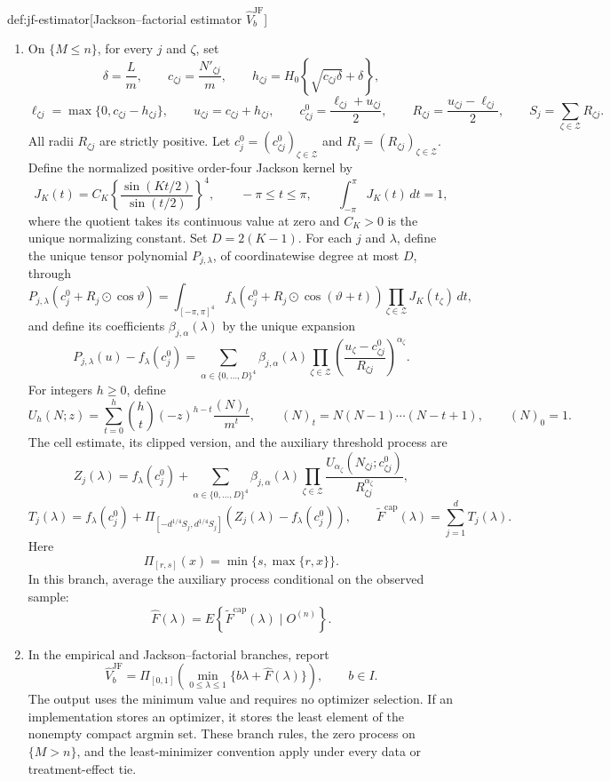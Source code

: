 \documentclass[11pt]{article}
\begin{document}
\begin{algorithmv}{def:jf-estimator}[Jackson–factorial estimator $\widehat V_b^{\mathrm{JF}}$]
\begin{enumerate}
\item On \(\{M\leq n\}\), for every \(j\) and \(\zeta\), set
\[
\delta=\frac Lm,\qquad
c_{\zeta j}=\frac{N'_{\zeta j}}m,\qquad
h_{\zeta j}=H_0\left\{\sqrt{c_{\zeta j}\delta}+\delta\right\},
\]
\[
\ell_{\zeta j}=\max\{0,c_{\zeta j}-h_{\zeta j}\},
\qquad
u_{\zeta j}=c_{\zeta j}+h_{\zeta j},
\qquad
c^0_{\zeta j}=\frac{\ell_{\zeta j}+u_{\zeta j}}2,
\qquad
R_{\zeta j}=\frac{u_{\zeta j}-\ell_{\zeta j}}2,
\qquad
S_j=\sum_{\zeta\in\mathcal Z}R_{\zeta j}.
\]
All radii \(R_{\zeta j}\) are strictly positive. Let \(c_j^0=(c^0_{\zeta j})_{\zeta\in\mathcal Z}\) and \(R_j=(R_{\zeta j})_{\zeta\in\mathcal Z}\). Define the normalized positive order-four Jackson kernel by
\[
J_K(t)=C_K\left\{\frac{\sin(Kt/2)}{\sin(t/2)}\right\}^{4},
\qquad -\pi\leq t\leq\pi,
\qquad
\int_{-\pi}^{\pi}J_K(t)\,dt=1,
\]
where the quotient takes its continuous value at zero and \(C_K>0\) is the unique normalizing constant. Set \(D=2(K-1)\). For each \(j\) and \(\lambda\), define the unique tensor polynomial \(P_{j,\lambda}\), of coordinatewise degree at most \(D\), through
\[
P_{j,\lambda}(c_j^0+R_j\odot\cos\vartheta)
=
\int_{[-\pi,\pi]^4}
f_\lambda\!\left(c_j^0+R_j\odot\cos(\vartheta+t)\right)
\prod_{\zeta\in\mathcal Z}J_K(t_\zeta)\,dt,
\]
and define its coefficients \(\beta_{j,\alpha}(\lambda)\) by the unique expansion
\[
P_{j,\lambda}(u)-f_\lambda(c_j^0)
=
\sum_{\alpha\in\{0,\ldots,D\}^4}
\beta_{j,\alpha}(\lambda)
\prod_{\zeta\in\mathcal Z}
\left(\frac{u_\zeta-c^0_{\zeta j}}{R_{\zeta j}}\right)^{\alpha_\zeta}.
\]
For integers \(h\geq0\), define
\[
U_h(N;z)
=
\sum_{t=0}^h {h\choose t}(-z)^{h-t}\frac{(N)_t}{m^t},
\qquad
(N)_t=N(N-1)\cdots(N-t+1),
\qquad
(N)_0=1.
\]
The cell estimate, its clipped version, and the auxiliary threshold process are
\[
Z_j(\lambda)
=
f_\lambda(c_j^0)+
\sum_{\alpha\in\{0,\ldots,D\}^4}
\beta_{j,\alpha}(\lambda)
\prod_{\zeta\in\mathcal Z}
\frac{U_{\alpha_\zeta}(N_{\zeta j};c^0_{\zeta j})}
{R_{\zeta j}^{\alpha_\zeta}},
\]
\[
T_j(\lambda)
=
f_\lambda(c_j^0)+
\Pi_{[-d^{1/4}S_j,d^{1/4}S_j]}
\!\left(Z_j(\lambda)-f_\lambda(c_j^0)\right),
\qquad
\widetilde F^{\mathrm{cap}}(\lambda)
=
\sum_{j=1}^d T_j(\lambda).
\]
Here
\[
\Pi_{[r,s]}(x)=\min\{s,\max\{r,x\}\}.
\]
In this branch, average the auxiliary process conditional on the observed sample:
\[
\widehat F(\lambda)
=
E\!\left\{\widetilde F^{\mathrm{cap}}(\lambda)\mid O^{(n)}\right\}.
\]

\item In the empirical and Jackson–factorial branches, report
\[
\widehat V_b^{\mathrm{JF}}
=
\Pi_{[0,1]}
\left(
\min_{0\leq\lambda\leq1}
\{b\lambda+\widehat F(\lambda)\}
\right),
\qquad b\in I.
\]
The output uses the minimum value and requires no optimizer selection. If an implementation stores an optimizer, it stores the least element of the nonempty compact argmin set. These branch rules, the zero process on \(\{M>n\}\), and the least-minimizer convention apply under every data or treatment-effect tie.
\end{enumerate}
\end{algorithmv}
\end{document}

